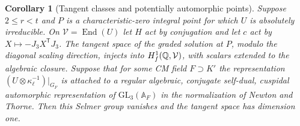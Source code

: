 \documentclass[a4paper,11pt]{article}
\newtheorem{corollary}[proposition]{Corollary}
\theoremstyle{definition}
\theoremstyle{remark}
\numberwithin{equation}{section}
\begin{document}
\begin{corollary}[Tangent classes and potentially automorphic points]
\label{cor:tangent119}
Suppose \(2\le r<t\) and \(P\) is a characteristic-zero integral
point for which \(U\) is absolutely irreducible. On
\(\mathcal V=\operatorname{End}(U)\) let \(H\) act by
conjugation and let \(c\) act by \(X\mapsto-J_3X^{\mathsf T}J_3\).
The tangent space of the graded solution at \(P\), modulo the
diagonal scaling direction, injects into
\(H^1_f(\mathbb Q,\mathcal V)\), with scalars extended to the
algebraic closure. Suppose that for some CM field \(F\supset K'\)
the representation \((U\otimes\kappa_\ell^{-1})|_{G_F}\)
is attached to a regular algebraic, conjugate self-dual,
cuspidal automorphic representation of \(\mathrm{GL}_3(\mathbb A_F)\)
in the normalization of Newton and Thorne. Then this Selmer
group vanishes and the tangent space has dimension one.
\end{corollary}
\end{document}

